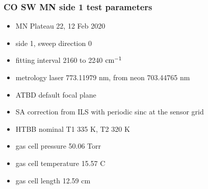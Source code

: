 \documentclass[9pt]{beamer}
\begin{document}
\begin{frame}
\frametitle{CO SW MN side 1 test parameters}

\begin{itemize}
  \item MN Plateau 22, 12 Feb 2020
  \item side 1, sweep direction 0
  \item fitting interval 2160 to 2240 $\mbox{cm$^{-1}$}$
  \item metrology laser 773.11979 nm, from neon 703.44765 nm
  \item ATBD default focal plane
  \item SA correction from ILS with periodic sinc at the sensor grid
  \item HTBB nominal T1 335 K, T2 320 K
  \item gas cell pressure 50.06 Torr
  \item gas cell temperature 15.57 C
  \item gas cell length 12.59 cm
\end{itemize}

\end{frame}
\end{document}
